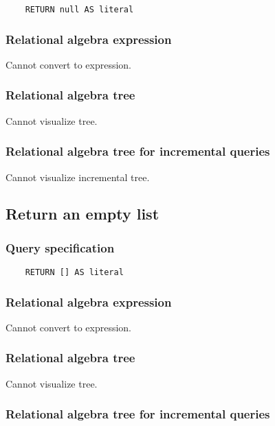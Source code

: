 	\begin{lstlisting}
	RETURN null AS literal
	\end{lstlisting}


	\subsubsection*{Relational algebra expression}

	Cannot convert to expression.

	\subsubsection*{Relational algebra tree}

	Cannot visualize tree.

	\subsubsection*{Relational algebra tree for incremental queries}

	Cannot visualize incremental tree.
	\subsection{Return an empty list}

	\subsubsection*{Query specification}

	\begin{lstlisting}
	RETURN [] AS literal
	\end{lstlisting}


	\subsubsection*{Relational algebra expression}

	Cannot convert to expression.

	\subsubsection*{Relational algebra tree}

	Cannot visualize tree.

	\subsubsection*{Relational algebra tree for incremental queries}

